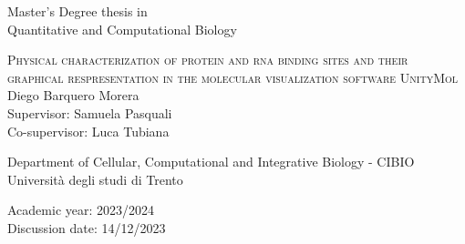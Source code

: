 \pagestyle{empty}
\begin{center}
  \begin{figure}[h!]
    \centerline{}
  \end{figure}

  \vspace{1 cm}
  \Large{Master's Degree thesis in\\Quantitative and Computational Biology\\}
  \vspace{1 cm}

  \LARGE\textsc{Physical characterization of protein and rna binding sites and their graphical respresentation in the molecular visualization software UnityMol\\}
  \vspace{0.5 cm}
  \LARGE{Diego Barquero Morera\\}
  \vspace{0.5 cm}
  \Large{Supervisor: Samuela Pasquali\\}
  \Large{Co-supervisor: Luca Tubiana\\}

  \vspace{2 cm}
  \Large{Department of Cellular, Computational and Integrative Biology - CIBIO\\}
  \Large{Università degli studi di Trento}
  \vspace{0.5 cm}

  \Large{Academic year: 2023/2024}\\
  \Large{Discussion date: 14/12/2023}
\end{center}
\maketitle
